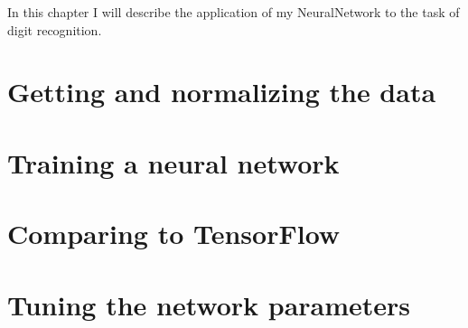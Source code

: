 In this chapter I will describe the application of my NeuralNetwork to the task of digit recognition.

\section{Getting and normalizing the data}


\section{Training a neural network}


\section{Comparing to TensorFlow}


\section{Tuning the network parameters}

